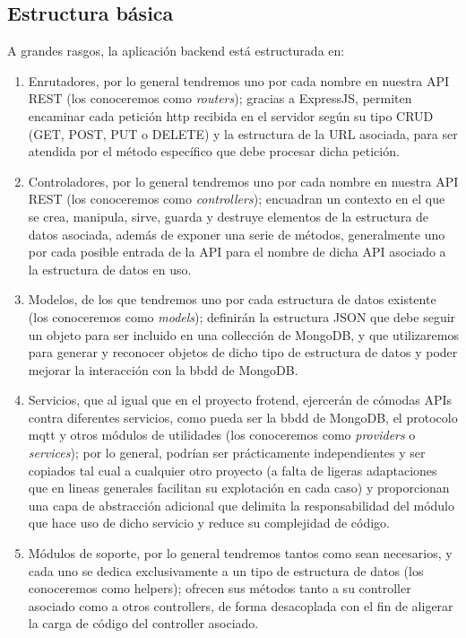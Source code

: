 \subsection{Estructura básica}
\label{ch:Capitulo4.8.2}

A grandes rasgos, la aplicación backend está estructurada en:
\begin{enumerate}
 \item Enrutadores, por lo general tendremos uno por cada nombre en nuestra API REST (los conoceremos como \textit{routers}); gracias a ExpressJS, permiten encaminar cada petición http recibida en el servidor según su tipo CRUD (GET, POST, PUT o DELETE) y la estructura de la URL asociada, para ser atendida por el método específico que debe procesar dicha petición.
 \item Controladores, por lo general tendremos uno por cada nombre en nuestra API REST (los conoceremos como \textit{controllers}); encuadran un contexto en el que se crea, manipula, sirve, guarda y destruye elementos de la estructura de datos asociada, además de exponer una serie de métodos, generalmente uno por cada posible entrada de la API para el nombre de dicha API asociado a la estructura de datos en uso.
 \item Modelos, de los que tendremos uno por cada estructura de datos existente (los conoceremos como \textit{models}); definirán la estructura JSON que debe seguir un objeto para ser incluido en una collección de MongoDB, y que utilizaremos para generar y reconocer objetos de dicho tipo de estructura de datos y poder mejorar la interacción con la \gls{bbdd} de MongoDB.
 \item Servicios, que al igual que en el proyecto frotend, ejercerán de cómodas APIs contra diferentes servicios, como pueda ser la \gls{bbdd} de MongoDB, el protocolo \gls{mqtt} y otros módulos de utilidades (los conoceremos como \textit{providers} o \textit{services}); por lo general, podrían ser prácticamente independientes y ser copiados tal cual a cualquier otro proyecto (a falta de ligeras adaptaciones que en lineas generales facilitan su explotación en cada caso) y proporcionan una capa de abstracción adicional que delimita la responsabilidad del módulo que hace uso de dicho servicio y reduce su complejidad de código.
 \item Módulos de soporte, por lo general tendremos tantos como sean necesarios, y cada uno se dedica exclusivamente a un tipo de estructura de datos (los conoceremos como helpers); ofrecen sus métodos tanto a su controller asociado como a otros controllers, de forma desacoplada con el fin de aligerar la carga de código del controller asociado.

\end{enumerate}
